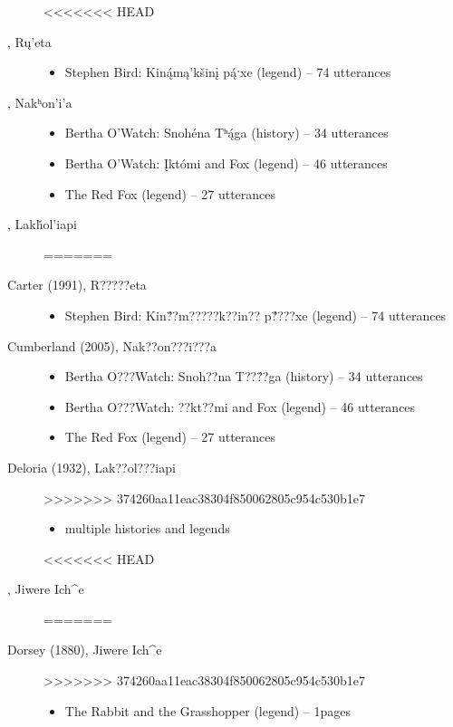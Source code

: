 \documentclass[output=paper]{LSP/langsci}
\begin{document}
\begin{description}

<<<<<<< HEAD
\item[\citet{Carter1991}, Rų’eta]\hfill
\begin{itemize}
\item Stephen Bird: Kin\'ąmą’kšinį p\'ąˑxe (legend) -- 74 utterances
\end{itemize}

\item[\citet{Cumberland2005}, Nakʰon’i’a]\hfill
\begin{itemize}
\item Bertha O’Watch: Snohéna Tʰ\'ąga (history) -- 34 utterances
\item Bertha O’Watch: Įktómi and Fox (legend) -- 46 utterances
\item The Red Fox (legend) -- 27 utterances
\end{itemize}

\item[\citet{Deloria1932}, Lakȟol’iapi]\hfill
=======
\item[Carter (1991), R?????eta]\hfill
\begin{itemize}
\item Stephen Bird: Kin\'??m?????k??in?? p\'????xe (legend) -- 74 utterances
\end{itemize}

\item[Cumberland (2005), Nak??on???i???a]\hfill
\begin{itemize}
\item Bertha O???Watch: Snoh??na T??\'??ga (history) -- 34 utterances
\item Bertha O???Watch: ??kt??mi and Fox (legend) -- 46 utterances
\item The Red Fox (legend) -- 27 utterances
\end{itemize}

\item[Deloria (1932), Lak??ol???iapi]\hfill
>>>>>>> 374260aa11eac38304f850062805c954c530b1e7
\begin{itemize}
\item multiple histories and legends
\end{itemize}

<<<<<<< HEAD
\item[\citet{Dorsey1880}, Jiwere Ich\^{}e]\hfill
=======
\item[Dorsey (1880), Jiwere Ich\^{}e]\hfill
>>>>>>> 374260aa11eac38304f850062805c954c530b1e7
\begin{itemize}
\item The Rabbit and the Grasshopper (legend) -- 1\textonehalf{}pages
\end{itemize}


\end{description}
\end{document}
